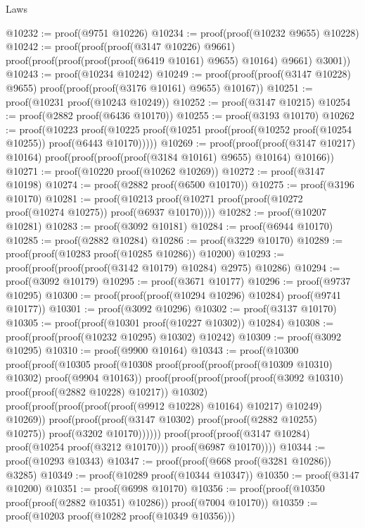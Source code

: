 \begin{lexlean}{Laws}
\begin{coremodule}
@10232 := proof(@9751 @10226)
@10234 := proof(proof(@10232 @9655) @10228)
@10242 := proof(proof(proof(@3147 @10226) @9661)
      proof(proof(proof(proof(proof(@6419 @10161) @9655) @10164) @9661) @3001))
@10243 := proof(@10234 @10242)
@10249 := proof(proof(proof(@3147 @10228) @9655) proof(proof(proof(@3176 @10161) @9655) @10167))
@10251 := proof(@10231 proof(@10243 @10249))
@10252 := proof(@3147 @10215)
@10254 := proof(@2882 proof(@6436 @10170))
@10255 := proof(@3193 @10170)
@10262 := proof(@10223
      proof(@10225 proof(@10251 proof(proof(@10252 proof(@10254 @10255)) proof(@6443 @10170)))))
@10269 := proof(proof(proof(@3147 @10217) @10164)
      proof(proof(proof(proof(@3184 @10161) @9655) @10164) @10166))
@10271 := proof(@10220 proof(@10262 @10269))
@10272 := proof(@3147 @10198)
@10274 := proof(@2882 proof(@6500 @10170))
@10275 := proof(@3196 @10170)
@10281 := proof(@10213 proof(@10271 proof(proof(@10272 proof(@10274 @10275)) proof(@6937 @10170))))
@10282 := proof(@10207 @10281)
@10283 := proof(@3092 @10181)
@10284 := proof(@6944 @10170)
@10285 := proof(@2882 @10284)
@10286 := proof(@3229 @10170)
@10289 := proof(proof(@10283 proof(@10285 @10286)) @10200)
@10293 := proof(proof(proof(proof(@3142 @10179) @10284) @2975) @10286)
@10294 := proof(@3092 @10179)
@10295 := proof(@3671 @10177)
@10296 := proof(@9737 @10295)
@10300 := proof(proof(proof(@10294 @10296) @10284) proof(@9741 @10177))
@10301 := proof(@3092 @10296)
@10302 := proof(@3137 @10170)
@10305 := proof(proof(@10301 proof(@10227 @10302)) @10284)
@10308 := proof(proof(proof(@10232 @10295) @10302) @10242)
@10309 := proof(@3092 @10295)
@10310 := proof(@9900 @10164)
@10343 := proof(@10300
      proof(proof(@10305
            proof(@10308
                proof(proof(proof(proof(@10309 @10310) @10302) proof(@9904 @10163))
                    proof(proof(proof(proof(proof(@3092 @10310) proof(proof(@2882 @10228) @10217))
                            @10302)
                          proof(proof(proof(proof(proof(@9912 @10228) @10164) @10217) @10249)
                              @10269))
                        proof(proof(proof(@3147 @10302) proof(proof(@2882 @10255) @10275))
                            proof(@3202 @10170))))))
          proof(proof(proof(@3147 @10284) proof(@10254 proof(@3212 @10170))) proof(@6987 @10170))))
@10344 := proof(@10293 @10343)
@10347 := proof(proof(@668 proof(@3281 @10286)) @3285)
@10349 := proof(@10289 proof(@10344 @10347))
@10350 := proof(@3147 @10200)
@10351 := proof(@6998 @10170)
@10356 := proof(proof(@10350 proof(proof(@2882 @10351) @10286)) proof(@7004 @10170))
@10359 := proof(@10203 proof(@10282 proof(@10349 @10356)))

\end{coremodule}
\end{lexlean}

